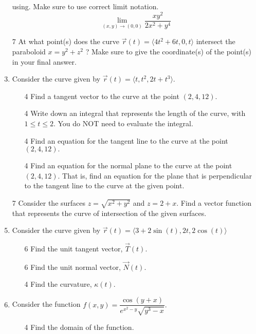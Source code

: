 \documentclass[addpoints,12pt]{exam}
\begin{document}
\begin{enumerate}
using. Make sure to use correct limit notation.
$$\displaystyle\lim_{(x,y) \to (0,0)} \dfrac{xy^2}{2x^2 + y^4}$$
\vfill
\newpage
\item[7] At what point(s) does the curve $\vec{r}(t) = \langle 4t^2+6t, 0, t \rangle$ intersect
the paraboloid $x = y^2+z^2$ ? Make sure to give the coordinate(s) of the point(s) in your final
answer.
\newpage
\item Consider the curve given by $\vec{r}(t)=\langle t, t^2, 2t+t^3\rangle.$
\begin{itemize}
\item[4] Find a tangent vector to the curve at the point $(2,4,12).$
\vfill
\item[4] Write down an integral that represents the length of the curve, with $1 \le t \le 2.$ You do
NOT need to evaluate the integral.
\vfill
\item[4] Find an equation for the tangent line to the curve at the point $(2,4,12).$
\vfill
\item[4] Find an equation for the normal plane to the curve at the point $(2,4,12).$ That is, find
an equation for the plane that is perpendicular to the tangent line to the curve at the given point.
\vfill
\vfill
\end{itemize}
\newpage
\item[7] Consider the surfaces $ z = \sqrt{x^2+y^2}$ and $ z = 2+x.$ Find a vector function
that represents the curve of intersection of the given surfaces.
\newpage
\item Consider the curve given by $\vec{r}(t)=\langle 3+2\sin(t),2t,2\cos(t)\rangle$
\begin{itemize}
\item[6] Find the unit tangent vector, $\vec{T}(t).$
\vfill
\item[6] Find the unit normal vector, $\vec{N}(t).$
\vfill
\item[4] Find the curvature, $\kappa(t).$
\vfill
\end{itemize}
\newpage
\item Consider the function $f(x,y) = \dfrac{\cos(y+x)}{ e^{x^2 -y}\sqrt{y^3-x}}.$
\begin{itemize}
\item[4] Find the domain of the function.
\vfill

\end{itemize}
\end{enumerate}
\end{document}
